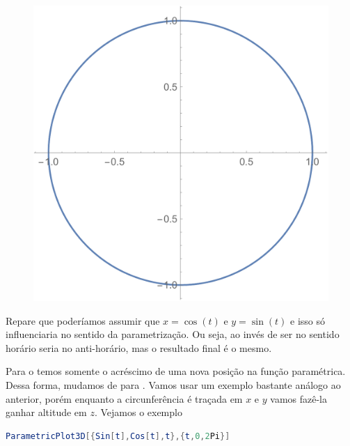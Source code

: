 \documentclass[a4paper, 12pt]{article}
\begin{document}
\begin{figure}[!h]
	\centering
	\includegraphics[scale=.5]{images/ParametricPlot}
\end{figure}

Repare que poderíamos assumir que $x=\cos(t)$ e $y=\sin(t)$ e isso só influenciaria no sentido da parametrização. Ou seja, ao invés de ser no sentido horário seria no anti-horário, mas o resultado final é o mesmo.

Para o  temos somente o acréscimo de uma nova posição na função paramétrica. Dessa forma, mudamos de  para . Vamos usar um exemplo bastante análogo ao anterior, porém enquanto a circunferência é traçada em $x$ e $y$ vamos fazê-la ganhar altitude em $z$. Vejamos o exemplo

\begin{lstlisting}[language=Mathematica]
ParametricPlot3D[{Sin[t],Cos[t],t},{t,0,2Pi}]
\end{lstlisting}
\end{document}

